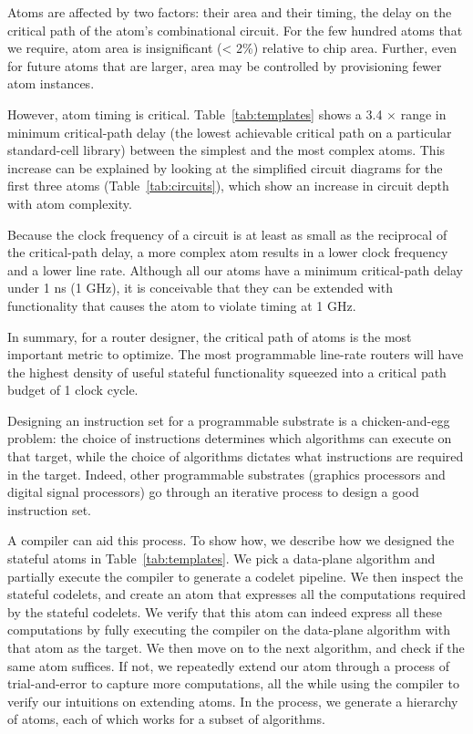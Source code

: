  Atoms are affected by
two factors: their area and their timing, \ie the delay on the critical path of
the atom's combinational circuit. For the few hundred atoms that we require,
atom area is insignificant (< 2\%) relative to chip area.  Further, even for
future atoms that are larger, area may be controlled by provisioning fewer atom
instances.

However, atom timing is critical. Table~\ref{tab:templates} shows a 3.4
$\times$ range in minimum critical-path delay (\ie the lowest achievable
critical path on a particular standard-cell library) between the simplest and
the most complex atoms.  This increase can be explained by looking at the
simplified circuit diagrams for the first three atoms
(Table~\ref{tab:circuits}), which show an increase in circuit depth with atom
complexity.

Because the clock frequency of a circuit is at least as small as the reciprocal
of the critical-path delay, a more complex atom results in a lower clock
frequency and a lower line rate. Although all our atoms have a minimum
critical-path delay under 1 ns (1 GHz), it is conceivable that they can be
extended with functionality that causes the atom to violate timing at 1 GHz.

In summary, for a router designer, the critical path of atoms is the most
important metric to optimize. The most programmable line-rate routers will have
the highest density of useful stateful functionality squeezed into a critical
path budget of 1 clock cycle.

 Designing an
instruction set for a programmable substrate is a chicken-and-egg problem: the
choice of instructions determines which algorithms can execute on that target,
while the choice of algorithms dictates what instructions are required in the
target. Indeed, other programmable substrates (\eg graphics processors and
digital signal processors) go through an iterative process to design a good
instruction set.

 A compiler can aid this process. To show how, we describe how we designed the
stateful atoms in Table~\ref{tab:templates}. We pick a data-plane algorithm and
partially execute the \pktlanguage compiler to generate a codelet pipeline.  We
then inspect the stateful codelets, and create an atom that expresses all the
computations required by the stateful codelets. We verify that this atom can
indeed express all these computations by fully executing the compiler on the
data-plane algorithm with that atom as the target. We then move on to the next
algorithm, and check if the same atom suffices. If not, we repeatedly extend
our atom through a process of trial-and-error to capture more computations, all
the while using the compiler to verify our intuitions on extending atoms. In
the process, we generate a hierarchy of atoms, each of which works for a subset
of algorithms.

